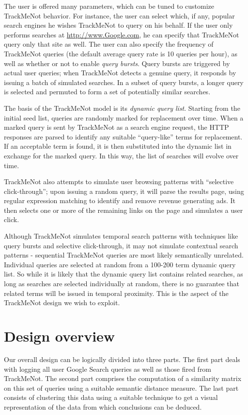 \documentclass{llncs}
\begin{document}
\begin{multicols}{2}
The user is offered many parameters, which can be tuned to customize
TrackMeNot behavior. For instance, the user can select which, if any,
popular search engines he wishes TrackMeNot to query on his behalf. If
the user only performs searches at \url{http://www.Google.com}, he can
specify that TrackMeNot query only that site as well. The user can
also specify the frequency of TrackMeNot queries (the default average
query rate is 10 queries per hour), as well as whether or not to
enable {\it query bursts}. Query bursts are triggered by actual user
queries; when TrackMeNot detects a genuine query, it responds by
issuing a batch of simulated searches. In a subset of query bursts, a
longer query is selected and permuted to form a set of potentially
similar searches.

The basis of the TrackMeNot model is its {\it dynamic query
  list}. Starting from the initial seed list, queries are randomly
marked for replacement over time. When a marked query is sent by TrackMeNot as a
search engine request, the HTTP responses are parsed to identify any
suitable ``query-like'' terms for replacement. If an acceptable term
is found, it is then substituted into the dynamic list in exchange for
the marked query. In this way, the list of searches will evolve over
time.

TrackMeNot also attempts to simulate user browsing patterns with
``selective click-through''; upon issuing a random query,
it will parse the results page, using regular expression matching to
identify and remove revenue generating ads. It then selects one or
more of the remaining links on the page and simulates a user click.

Although TrackMeNot simulates temporal search patterns with techniques
like query bursts and selective click-through, it may not simulate
contextual search patterns - sequential TrackMeNot queries are most
likely semantically unrelated. Individual queries are selected at
random from a 100-200 term dynamic query list. So while it is likely
that the dynamic query list contains related searches, as long as
searches are selected individually at random, there is no guarantee
that related terms will be issued in temporal proximity. This is the
aspect of the TrackMeNot design we wish to exploit.

\section{Design overview}
\label{sec:design}
Our overall design can be logically divided into three parts. The
first part deals with logging all user Google Search queries as well
as those fired from TrackMeNot. The second part comprises the
computation of a similarity matrix on this set of queries using a
suitable semantic distance measure. The last part consists of
clustering this data using a suitable technique to get a visual
representation of the data from which conclusions can be deduced.


\end{multicols}
\end{document}
